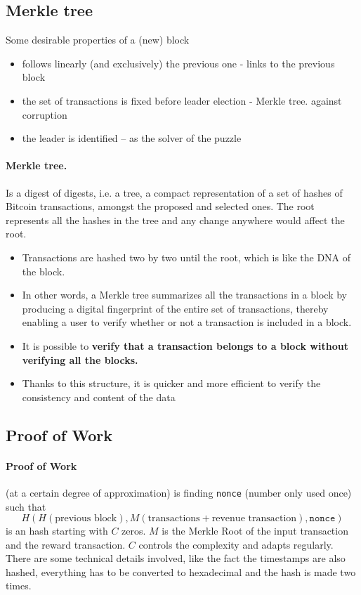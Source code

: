 \subsection{Merkle tree}

Some desirable properties of a (new) block
\begin{itemize}
	\item follows linearly (and exclusively) the previous one - links to the previous block
	\item the set of transactions is fixed before leader election - Merkle tree. against corruption
	\item the leader is identified – as the solver of the puzzle
\end{itemize}

\paragraph*{Merkle tree.} Is a digest of digests, i.e. a tree, a compact representation of a set of hashes of Bitcoin transactions, amongst the proposed and selected ones. The root represents all the hashes in the tree and any change anywhere would affect the root.
\begin{itemize}
	\item Transactions are hashed two by two until the root, which is like the DNA of the block.
	\item In other words, a Merkle tree summarizes all the transactions in a block by producing a digital fingerprint of the entire set of transactions, thereby enabling a user to verify whether or not a transaction is included in a block.
	\item It is possible to \textbf{verify that a transaction belongs to a block without verifying all the blocks.}
	\item Thanks to this structure, it is quicker and more efficient to verify the consistency and content of the data
\end{itemize}


\subsection{Proof of Work}

\paragraph*{Proof of Work} (at a certain degree of approximation) is finding \texttt{nonce} (number only used once) such that 
\begin{equation*}
	H(H(\text{previous block}),M(\text{transactions} +\text{revenue transaction}),\texttt{nonce})
\end{equation*}
is an hash starting with $C$ zeros. $M$ is the Merkle Root of the input transaction and the reward transaction. $C$ controls the complexity and adapts regularly. There are some technical details involved, like the fact the timestamps are also hashed, everything has to be converted to hexadecimal and the hash is made two times.

